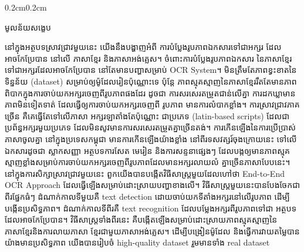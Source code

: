 \setlength{\parskip}{0.5em}
\linespread{1.5}\selectfont
\begin{adjustwidth}{0.2cm}{0.2cm}

    \begin{center}
        {\khmerfont\fontsize{15pt}{25pt}\selectfont មូលន័យសង្ខេប \par}
    \end{center}
    \label{khmer-abstract}
    \vspace{0.5cm}
    \khmernormal
    \small
    នៅក្នុងអត្ថបទស្រាវជ្រាវមួយនេះ យើងនឹងបង្ហាញអំពី ការបំប្លែងរូបភាពឯកសារទៅជាអក្សរ 
    ដែលអាចកែប្រែបាន នៅលើ ភាសាខ្មែរ និងភាសាអង់គ្លេស។ ចំពោះការបំប្លែងរូបភាពឯកសារ 
    នៃភាសាខ្មែរ ទៅជាអក្សរដែលអាចកែប្រែបាន នៅតែមានបញ្ហាសម្រាប់ 
    {\englishfont\fontsize{13.5pt}{20pt}\selectfont OCR System}។ 
    មិនត្រឹមតែភាពខ្វះខាតនៃ ទិន្នន័យ 
    {\englishfont\fontsize{13.5pt}{20pt}\selectfont (dataset)} 
    សម្រាប់ឲ្យម៉ូដែលរៀនប៉ុណ្ណោះទេ ប៉ុន្តែ 
    ភាពស្មុគស្មាញនៃភាសាខ្មែររឹតតែមានភាពពិបាកក្នុងការចាប់យកអក្សរចេញពីរូបភាពផងដែរ 
    ដូចជា ការសរសេរតម្រួតជាន់លើគ្នា ការដកឃ្លាមានភាពមិនទៀតទាត់ ដែលធ្វើឲ្យការចាប់យកអក្សរចេញពី 
    រូបភាព មានការលំបាកខ្លាំង។ ការស្រាវជ្រាវភាគច្រើន គឺគេធ្វើតែទៅលើភាសា 
    អក្សរឡាតាំងតែប៉ុណ្ណោះ ជាប្រភេទ 
    {\englishfont\fontsize{13.5pt}{20pt}\selectfont (latin-based scripts)}  
    ដែលជាប្រព័ន្ធអក្សរមួយប្រភេទ 
    ដែលមិនសូវមានការសរសេរតម្រួតគ្នាច្រើនតង់។ ការកើនឡើងនៃការប្រើប្រាស់ភាសាចូលគ្នា 
    នៅក្នុងប្រទេសកម្ពុជា មានការកើនឡើងយ៉ាងខ្លាំង នៅពីរទសវត្សរ៍ចុងក្រោយនេះ 
    ទៅលើឯកសារដូចជា ស្លាកសញ្ញា អត្ថបទការសែត មេរៀន និងការសន្ទនាផ្សេងៗ 
    ដែលបង្កឲ្យមានភាពស្មុគស្មាញខ្លាំងសម្រាប់ការចាប់យកអក្សរចេញពីរូបភាពដែលមានអក្សរលាយលំ 
    គ្នាច្រើនភាសាបែបនេះ។ នៅក្នុងការសិក្សាស្រាវជ្រាវមួយនេះ ពួកយើងបានបង្កើតវិធីសាស្ដ្រមួយដែលហៅថា 
    {\englishfont\fontsize{13.5pt}{20pt}\selectfont End-to-End OCR Approach}  
    ដែលធ្វើឡើងសម្រាប់ដោះស្រាយបញ្ហាខាងលើ។ វិធីសាស្ដ្រមួយនេះបានបែងចែកជាពីរផ្នែកធំៗ 
    ដំណាក់កាលទីមួយគឺ 
    {\englishfont\fontsize{13.5pt}{20pt}\selectfont text detection} 
    ដោយចាប់យកទីតាំងអក្សរនៅលើរូបភាព ដើម្បីបង្កើនប្រសិទ្ធភាព។ 
    ដំណាក់កាលទីពីរគឺ 
    {\englishfont\fontsize{13.5pt}{20pt}\selectfont text recognition} 
    ដែលបម្លែងអក្សរពីរូបភាពទៅជា អត្ថបទដែលអាចកែប្រែបាន។ 
    វិធីសាស្ត្រទាំងពីរនេះ គឺបង្កើតឡើងសម្រាប់ដោះស្រាយភាពស្មុគស្មាញនៃភាសាខ្មែរនិងការលាយភាសា 
    ខ្មែរជាមួយភាសាអង់គ្លេស។ ដើម្បីបង្រៀនម៉ូដែល និងធ្វើការវាយតម្លៃបានយ៉ាងមានប្រសិទ្ធភាព 
    យើងបានរៀបចំ 
    {\englishfont\fontsize{13.5pt}{20pt}\selectfont high-quality dataset} 
    រួមមានទាំង 
    {\englishfont\fontsize{13.5pt}{20pt}\selectfont real dataset} 

\end{adjustwidth}
